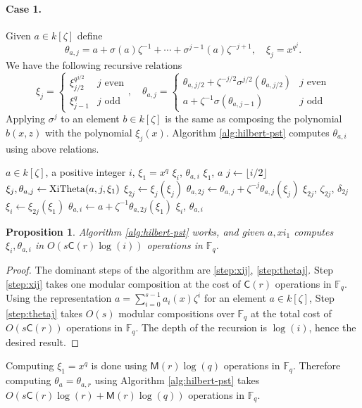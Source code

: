 \documentclass[12pt]{article}
\theoremstyle{plain}
\newtheorem{proposition}[theorem]{Proposition}
\theoremstyle{definition}
\def\F{\ensuremath{\mathbb{F}}}
\def\MM{\ensuremath{\mathsf{M}}}
\def\CC{\ensuremath{\mathsf{C}}}
\newcounter{algorithm}
\begin{document}
\paragraph{Case 1.} 
Given $a \in k[\zeta]$ define 
\[ \theta_{a, j} = a + \sigma(a)\zeta^{-1} + \cdots + \sigma^{j - 1}(a)\zeta^{-j + 1}, \quad \xi_j 
= x^{q^j}. \]
We have the following recursive relations
\[
\xi_j = 
\begin{cases}
\xi_{j / 2}^{q^{j / 2}} & j \text{ even} \\
\xi_{j - 1}^q & j \text{ odd}
\end{cases}, \quad
\theta_{a, j} = 
\begin{cases}
\theta_{a, j / 2} + \zeta^{-j / 2}\sigma^{j / 2}(\theta_{a, j / 2})& j \text{ even} \\
a + \zeta^{-1}\sigma(\theta_{a, j - 1}) & j \text{ odd}
\end{cases}
\]
Applying $\sigma^j$ to an element $b \in k[\zeta]$ is the same as composing the polynomial $b(x, 
z)$ with the polynomial $\xi_j(x)$. Algorithm \ref{alg:hilbert-pst} computes $\theta_{a, i}$ 
using above relations.

\begin{algorithm}
	\label{alg:hilbert-pst}
	\begin{algorithmic}[1]
		\REQUIRE $a \in k[\zeta]$, a positive integer $i$, $\xi_1=x^q$
		\ENSURE $\xi_i$, $\theta_{a, i}$
		\RETURN $\xi_1$, $a$
		\ENDIF
		\STATE $j \leftarrow \lfloor i / 2 \rfloor$
		\STATE $\xi_{j},\theta_{a, j} \leftarrow {\rm XiTheta}(a, j, \xi_1)$ 
		\STATE\label{step:xij} $\xi_{2j} \leftarrow \xi_j(\xi_j)$
		\STATE\label{step:thetaj} $\theta_{a, 2j} \leftarrow \theta_{a, j} + \zeta^{-j}\theta_{a, 
			j}(\xi_j)$
		\RETURN $\xi_{2j}$, $\zeta_{2j}$, $\delta_{2j}$
		\ENDIF
		\STATE $\xi_i \leftarrow \xi_{2j}(\xi_1)$
		\STATE $\theta_{a, i} \leftarrow a + \zeta^{-1}\theta_{a, 2j}(\xi_1)$
		\RETURN $\xi_i$, $\theta_{a, i}$
	\end{algorithmic}
\end{algorithm}

\begin{proposition}
	\label{prop:xitheta}
	Algorithm \ref{alg:hilbert-pst} works, and given $a,xi_1$ computes $\xi_i, \theta_{a, i}$ in  
	$O(s\CC(r)\log(i))$ operations in $\F_q$.
\end{proposition}
\begin{proof}
	The dominant steps of the algorithm are \ref{step:xij}, \ref{step:thetaj}. Step \ref{step:xij} 
	takes one modular composition at the cost of $\CC(r)$ operations in $\F_q$. Using the 
	representation $a = \sum_{i = 0}^{s - 1}a_i(x)\zeta^i$ for an element $a \in k[\zeta]$, Step 
	\ref{step:thetaj} takes $O(s)$ modular compositions over $\F_q$ at the total cost of 
	$O(s\CC(r))$ operations in $\F_q$. The depth of the recursion is $\log(i)$, hence the desired 
	result.
\end{proof}
Computing $\xi_1 = x^q$ is done using $\MM(r)\log(q)$ operations in $\F_q$. Therefore computing 
$\theta_a = \theta_{a, r}$ using Algorithm \ref{alg:hilbert-pst} takes $O(s\CC(r)\log(r) + 
\MM(r)\log(q))$ operations in $\F_q$.
\end{document}
